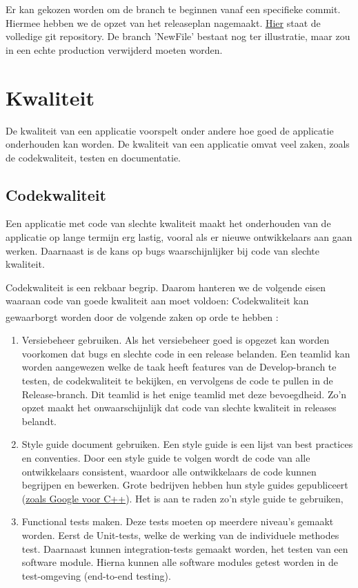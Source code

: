 \documentclass[12pt]{article}
\begin{document}
Er kan gekozen worden om de branch te beginnen vanaf een specifieke commit. Hiermee hebben we de opzet van het releaseplan nagemaakt.
\href{https://github.com/kndschilders/ReleasePlanGitTest}{Hier}
staat de volledige git repository. De branch 'NewFile' bestaat nog ter illustratie, maar zou in een echte production verwijderd moeten worden.

\pagebreak
\section{Kwaliteit}
De kwaliteit van een applicatie voorspelt onder andere hoe goed de applicatie onderhouden kan worden. De kwaliteit van een applicatie omvat veel zaken, zoals de codekwaliteit, testen en documentatie.

\subsection{Codekwaliteit}
Een applicatie met code van slechte kwaliteit maakt het onderhouden van de applicatie op lange termijn erg lastig, vooral als er nieuwe ontwikkelaars aan gaan werken. Daarnaast is de kans op bugs waarschijnlijker bij code van slechte kwaliteit.

Codekwaliteit is een rekbaar begrip. Daarom hanteren we de volgende eisen waaraan code van goede kwaliteit aan moet voldoen:
Codekwaliteit kan gewaarborgt worden door de volgende zaken op orde te hebben \textsuperscript{\cite{code_quality}}:

\begin{enumerate}
	\item Versiebeheer gebruiken. Als het versiebeheer goed is opgezet kan worden voorkomen dat bugs en slechte code in een release belanden. Een teamlid kan worden aangewezen welke de taak heeft features van de Develop-branch te testen, de codekwaliteit te bekijken, en vervolgens de code te pullen in de Release-branch. Dit teamlid is het enige teamlid met deze bevoegdheid. Zo'n opzet maakt het onwaarschijnlijk dat code van slechte kwaliteit in releases belandt.
	\item Style guide document gebruiken. Een style guide is een lijst van best practices en conventies. Door een style guide te volgen wordt de code van alle ontwikkelaars consistent, waardoor alle ontwikkelaars de code kunnen begrijpen en bewerken. Grote bedrijven hebben hun style guides gepubliceert (\href{https://google.github.io/styleguide/cppguide.html}{zoals Google voor C++}). Het is aan te raden zo'n style guide te gebruiken,
	\item Functional tests maken. Deze tests moeten op meerdere niveau's gemaakt worden. Eerst de Unit-tests, welke de werking van de individuele methodes test. Daarnaast kunnen integration-tests gemaakt worden, het testen van een software module. Hierna kunnen alle software modules getest worden in de test-omgeving (end-to-end testing).
\end{enumerate}
\end{document}
